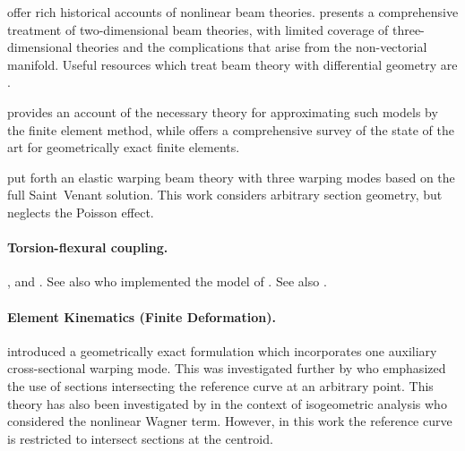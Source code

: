 
\cite{oreilly2017modeling,goss2003snap} offer rich historical accounts of nonlinear beam theories. 
\cite{hjelmstad2005fundamentals} presents a comprehensive treatment of two-dimensional beam theories, with limited coverage of three-dimensional theories and the complications that arise from the non-vectorial manifold. 
Useful resources which treat beam theory with  differential geometry are \cite{landau1970theory,connor1976analysis}. 

\cite{zienkiewicz2014finite} provides an account of the
necessary theory for approximating such models by the finite element method,
while \cite{meier2019geometrically} offers a comprehensive survey of the 
state of the art for geometrically exact finite elements. 






\cite{elfatmi2007nonuniform} put forth an elastic warping beam theory with three warping modes based on the full Saint~Venant solution. 
This work considers  arbitrary section geometry, but neglects the Poisson effect.



\paragraph{Torsion-flexural coupling.}
\cite{kim2005exact,elfatmi2007nonuniform}, and \cite{du2020threedimensional}. 
See also \cite{lewinski2021incorporating} who implemented the model of \cite{elfatmi2007nonuniform}.
See also \cite{ladeveze1998new}.


\paragraph{Element Kinematics (Finite Deformation).}
\cite{simo1991geometricallyexact} introduced a geometrically exact formulation which incorporates one auxiliary cross-sectional warping mode. 
This was investigated further by \cite{gruttmann2000theory} who emphasized the use of sections intersecting the reference curve at an arbitrary point. 
This theory has also been investigated by \cite{rong2020geometrically} in the context of isogeometric analysis who considered the nonlinear Wagner term. 
However, in this work the reference curve is restricted to intersect sections at the centroid. 

